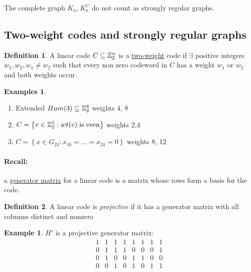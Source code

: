 \documentclass[]{article}
\theoremstyle{definition}
\newtheorem*{defn}{Definition}
\newtheorem*{exmp}{Example}
\newtheorem*{exmps}{Examples}
\theoremstyle{remark}
\numberwithin{equation}{section}
\begin{document}
		The complete graph $K_n, K_n^C$ do not count as strongly regular graphs.
	\subsection{Two-weight codes and strongly regular graphs}
		\begin{defn}
			A linear code $C \subseteq \mathbb{Z}_2^n$ is a \underline{two-weight} code if $\exists$ positive integers $w_1, w_2, w_1 \neq w_2$ such that every non zero codeword in $C$ has a weight $w_1$ or $w_2$ and both weights occur.
		\end{defn}

		\begin{exmps}\hfill
			\begin{enumerate}
				\item Extended $Ham(3) \subseteq \mathbb{Z}_2^8$ weights 4, 8
				\item $C = \left\{v \in \mathbb{Z}_2^5 : wt(v)\; \text{is even} \right\}$ weights 2,4
				\item $C = \left\{ x \in G_{24} : x_{16} = \hdots = x_{24} = 0\right\}$ weights 8, 12
			\end{enumerate}
		\end{exmps}

		\paragraph*{Recall:} a \underline{generator matrix} for a linear code is a matrix whose rows form a basis for the code.

		\begin{defn}
			A linear code is \emph{projective} if it has a generator matrix with all columns distinct and nonzero
		\end{defn}

		\begin{exmp} $H'$ is a projective generator matrix:
		\[
			\begin{matrix}
				1 & 1 & 1 & 1 & 1 & 1 & 1 & 1\\
				0 & 1 & 1 & 1 & 0 & 0 & 0 & 1\\
				0 & 1 & 0 & 0 & 1 & 1 & 0 & 0\\
				0 & 0 & 1 & 0 & 1 & 0 & 1 & 1
			\end{matrix}
		\]
		\end{exmp}
\end{document}
